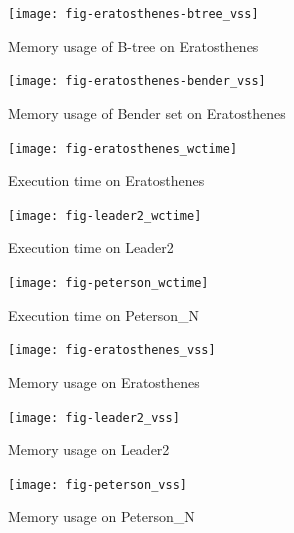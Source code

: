 \documentclass{acm_proc_article-sp}
\begin{document}
\begin{figure}[p]
\centering
\texttt{[image: fig-eratosthenes-btree\_vss]}
\caption{Memory usage of B-tree on Eratosthenes}
\label{fig-eratosthenes-btree_vss}
\end{figure}

\begin{figure}[p]
\centering
\texttt{[image: fig-eratosthenes-bender\_vss]}
\caption{Memory usage of Bender set on Eratosthenes}
\label{fig-eratosthenes-bender_vss}
\end{figure}

\begin{figure}[p]
\centering
\texttt{[image: fig-eratosthenes\_wctime]}
\caption{Execution time on Eratosthenes}
\label{fig-eratosthenes_wctime}
\end{figure}

\begin{figure}[p]
\centering
\texttt{[image: fig-leader2\_wctime]}
\caption{Execution time on Leader2}
\label{fig-leader2_wctime}
\end{figure}

\begin{figure}[p]
\centering
\texttt{[image: fig-peterson\_wctime]}
\caption{Execution time on Peterson\_N}
\label{fig-peterson_wctime}
\end{figure}

\begin{figure}[p]
\centering
\texttt{[image: fig-eratosthenes\_vss]}
\caption{Memory usage on Eratosthenes}
\label{fig-eratosthenes_vss}
\end{figure}

\begin{figure}[p]
\centering
\texttt{[image: fig-leader2\_vss]}
\caption{Memory usage on Leader2}
\label{fig-leader2_vss}
\end{figure}

\begin{figure}[p]
\centering
\texttt{[image: fig-peterson\_vss]}
\caption{Memory usage on Peterson\_N}
\label{fig-peterson_vss}
\end{figure}
\end{document}
